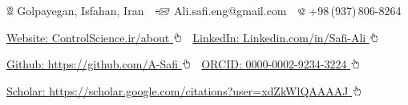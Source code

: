 \documentclass[letterpaper,MMMyyyy]{CVTemplate}
\newcommand{\CVAuthor}{Ali Safi}
\begin{document}
\centering
\Title{\CVAuthor} 
\begin{SubTitle}
{\includegraphics[height=8pt]{icons/locations.png} Golpayegan, Isfahan, Iran}
\,\SubBulletSymbol\,
{\includegraphics[height=7pt]{icons/SendEmail.png} Ali.safi.eng@gmail.com}
\,\SubBulletSymbol\,
\includegraphics[height=7pt]{icons/phone1.png}  +98\,(937)\,806-8264
\par
\href{https://www.controlscience.ir/about}{Website: \textcolor{Forestg}{ControlScience.ir/about} \includegraphics[height=9pt]{icons/hand-cursor.png}} 
\,\SubBulletSymbol\,
\href{https://www.linkedin.com/in/safi-ali}{LinkedIn: \textcolor{Forestg}{Linkedin.com/in/Safi-Ali} \includegraphics[height=9pt]{icons/hand-cursor.png}} 
\par
\href{https://github.com/A-Safi}{Github: \textcolor{Forestg}{https://github.com/A-Safi} \includegraphics[height=9pt]{icons/hand-cursor.png}} 
\,\SubBulletSymbol\,
\href{https://orcid.org/0000-0002-9234-3224}{ORCID: \textcolor{Forestg}{0000-0002-9234-3224} \includegraphics[height=9pt]{icons/hand-cursor.png}} 
\par
\href{https://scholar.google.com/citations?user=xdZkWlQAAAAJ}{Scholar: \textcolor{Forestg}{https://scholar.google.com/citations?user=xdZkWlQAAAAJ} \includegraphics[height=9pt]{icons/hand-cursor.png}}

\end{SubTitle}
\end{document}
